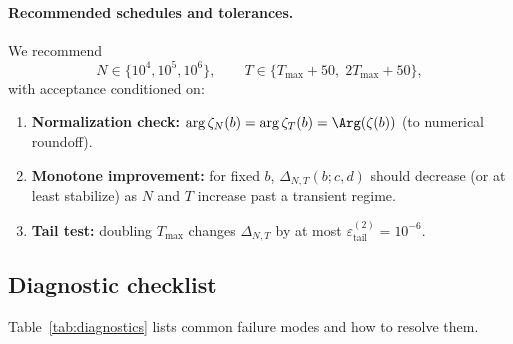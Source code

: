 \documentclass[11pt]{article}
\theoremstyle{definition}
\begin{document}
\paragraph{Recommended schedules and tolerances.}
We recommend
\[
N\in\{10^4,10^5,10^6\},
\qquad
T\in\{T_{\max}+50,\;2T_{\max}+50\},
\]
with acceptance conditioned on:
\begin{enumerate}
\item \textbf{Normalization check:} \(\arg\zeta_N(b)=\arg\zeta_T(b)=\Arg(\zeta(b))\) (to numerical
roundoff).
\item \textbf{Monotone improvement:} for fixed \(b\), \(\Delta_{N,T}(b;c,d)\) should decrease (or at
least stabilize) as \(N\) and \(T\) increase past a transient regime.
\item \textbf{Tail test:} doubling \(T_{\max}\) changes \(\Delta_{N,T}\) by at most
\(\varepsilon^{(2)}_{\mathrm{tail}}=10^{-6}\).
\end{enumerate}

\subsection{Diagnostic checklist}\label{subsec:diagnostics}
Table~\ref{tab:diagnostics} lists common failure modes and how to resolve them.
\end{document}

